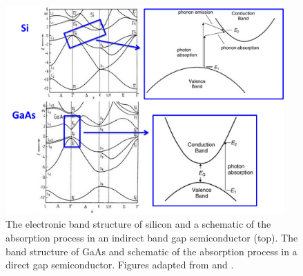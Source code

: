 \documentclass[11pt, twoside]{report}
\begin{document}
\begin{figure}[h!]
  \centering
    \includegraphics[width=0.95\textwidth]{figures/Si_and_GaAs.png}
    \caption[The electronic band structure of silicon and a schematic of the absorption process in an indirect band gap semiconductor (top). The band structure of GaAs and schematic of the absorption process in a direct gap semiconductor.]{The electronic band structure of silicon and a schematic of the absorption process in an indirect band gap semiconductor (top). The band structure of GaAs and schematic of the absorption process in a direct gap semiconductor. Figures adapted from  and .}
  \label{Si_and_GaAs}
\end{figure}
\end{document}
